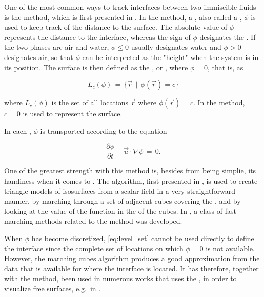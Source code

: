 One of the most common ways to track interfaces between two immiscible fluids is the \LS method, which is first presented in \citep{Osher1988}. In the \LS method, a , also called a , $\phi$ is used to keep track of the distance to the surface. The absolute value of $\phi$ represents the distance to the interface, whereas the sign of $\phi$ designates the \phase. If the two phases are air and water, $\phi \leq 0$ usually designates water and $\phi > 0$ designates air, so that $\phi$ can be interpreted as the "height" when the system is in its \equilibrium position. The surface is then defined as the \isosurface, or , where $\phi = 0$, that is, as

\begin{equation} \label{eq:level_set}
L_c(\phi) \,=\, \{\vec{r} \,\mid\, \phi(\vec{r})=c\}
\end{equation}

where $L_c(\phi)$ is the set of all locations $\vec{r}$ where $\phi(\vec{r}) = c$. In the \LS method, $c = 0$ is used to represent the surface.

In each , $\phi$ is transported according to the equation

\begin{equation} \label{eq:level_set_function_transport}
\frac{\partial\phi}{\partial t} + \vec{u}\cdot\nabla\phi \,=\, 0.
\end{equation}

One of the greatest strength with this method is, besides from being simplie, its handiness when it comes to . The  algorithm, first presented in \citep{Lorensen1987}, is used to create triangle models of isosurfaces from a scalar field in a very straightforward manner, by marching through a set of adjacent cubes covering the , and by looking at the value of the function in the  of the cubes. In \citep{Sethian1995}, a class of fast marching methods related to the \LS method was developed.

When $\phi$ has become discretized, \eqref{eq:level_set} cannot be used directly to define the interface since the complete set of locations on which $\phi = 0$ is not available. However, the marching cubes algorithm produces a good approximation from the data that is available for where the interface is located. It has therefore, together with the \LS method, been used in numerous works that uses the \FVM, in order to visualize free surfaces, e.g.\ in \citep{Losasso2004}.

